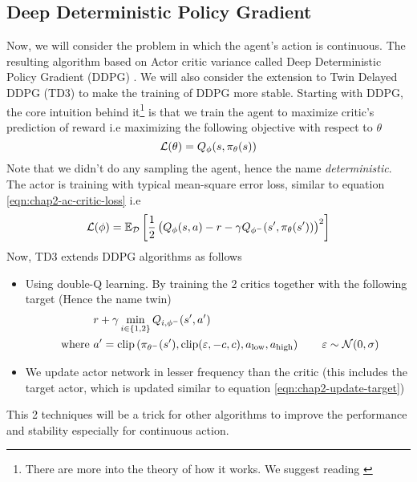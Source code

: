 \subsection{Deep Deterministic Policy Gradient}
Now, we will consider the problem in which the agent's action is continuous. The resulting algorithm based on Actor critic variance called Deep Deterministic Policy Gradient (DDPG) \cite{lillicrap2015continuous}. We will also consider the extension to Twin Delayed DDPG (TD3) \cite{fujimoto2018addressing} to make the training of DDPG more stable. Starting with DDPG, the core intuition behind it\footnote{There are more into the theory of how it works. We suggest reading \cite{silver2014deterministic}} is that we train the agent to maximize critic's prediction of reward i.e maximizing the following objective with respect to $\theta$
\begin{equation}
    \mathcal{L}(\theta) = Q_\phi(s, \pi_\theta(s))
\end{equation}
Note that we didn't do any sampling the agent, hence the name \textit{deterministic}.  The actor is training with typical mean-square error loss, similar to equation \ref{eqn:chap2-ac-critic-loss} i.e
\begin{equation}
    \mathcal{L}(\phi) = \mathbb{E}_{\mathcal{D}}\left[ \frac{1}{2}\left( Q_\phi(s, a) - r - \gamma Q_{\phi^-}(s', \pi_\theta(s')) \right)^2 \right]
\end{equation}
Now, TD3 extends DDPG algorithms as follows
\begin{itemize}
    \item Using double-Q learning. By training the 2 critics together with the following target (Hence the name twin)
    \begin{equation}
    \begin{aligned}
        &r + \gamma \min_{i \in \left\{ 1, 2 \right\}} Q_{i, \phi^-}(s', a') \\
        \text{ where }& a' = \text{clip}\left( \pi_{\theta^-}(s'), \text{clip}(\varepsilon, -c, c), a_\text{low}, a_\text{high} \right) \qquad \varepsilon \sim \mathcal{N}(0, \sigma)
    \end{aligned}
    \end{equation}
    \item We update actor network in lesser frequency than the critic (this includes the target actor, which is updated similar to equation \ref{eqn:chap2-update-target})
\end{itemize}
This 2 techniques will be a trick for other algorithms to improve the performance and stability especially for continuous action.